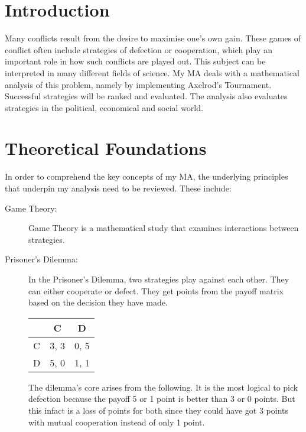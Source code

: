 \documentclass[4pt, english]{article}
\begin{document}
\begin{spacing}{0.7}

\section{Introduction}
	Many conflicts result from the desire to maximise one's own gain. These games of conflict often include strategies of defection or cooperation, which play an important role in how such conflicts are played out. This subject can be interpreted in many different fields of science. My MA deals with a mathematical analysis of this problem, namely by implementing Axelrod's Tournament. Successful strategies will be ranked and evaluated. The analysis also evaluates strategies in the political, economical and social world.

\section{Theoretical Foundations}
	In order to comprehend the key concepts of my MA, the underlying principles that underpin my analysis need to be reviewed. These include:
	\begin{description}
		\item[Game Theory:] Game Theory is a mathematical study that examines interactions between strategies.
		\item[Prisoner's Dilemma:] In the Prisoner's Dilemma, two strategies play against each other. They can either cooperate or defect. They get points from the payoff matrix based on the decision they have made.


\begin{center}
\begin{tabular}{ c|c|c }
   & C & D \\ 
   \hline
C & 3, 3 & 0, 5\\  
   \hline
 D & 5, 0 & 1, 1
\end{tabular}
\end{center}

The dilemma's core arises from the following. It is the most logical to pick defection because the payoff 5 or 1 point is better than 3 or 0 points. But this infact is a loss of points for both since they could have got 3 points with mutual cooperation instead of only 1 point. 


\end{description}
\end{spacing}
\end{document}
